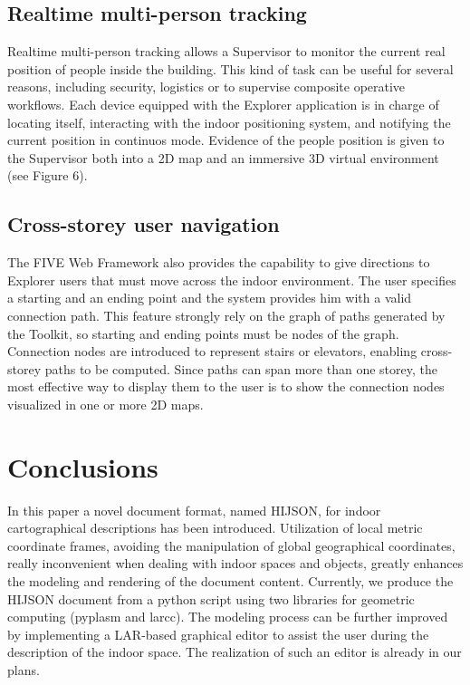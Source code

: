 \documentclass[]{egpubl}
\begin{document}
\subsection{Realtime multi-person tracking} Realtime multi-person tracking
allows a Supervisor to monitor the current real position of people inside the
building. This kind of task can be useful for several reasons, including
security, logistics or to supervise composite operative workflows. Each device
equipped with the Explorer application is in charge of locating itself,
interacting with the indoor positioning system, and notifying the current
position in continuos mode. Evidence of the people position is given to the
Supervisor both into a 2D map and an immersive 3D virtual environment (see
Figure 6).

\subsection{Cross-storey user navigation} The FIVE Web Framework also provides
the capability to give directions to Explorer users that must move across the
indoor environment. The user specifies a starting and an ending point and the
system provides him with a valid connection path. This feature strongly rely
on the graph of paths generated by the Toolkit, so starting and ending points
must be nodes of the graph. Connection nodes are introduced to represent
stairs or elevators, enabling cross-storey paths to be computed. Since paths
can span more than one storey, the most effective way to display them to the
user is to show the connection nodes visualized in one or more 2D maps.


\section{Conclusions}

In this paper a novel document format, named HIJSON, for indoor cartographical
descriptions has been introduced. Utilization of local metric coordinate
frames, avoiding the manipulation of global geographical coordinates, really
inconvenient when dealing with indoor spaces and objects, greatly enhances the
modeling and rendering of the document content. Currently, we produce the
HIJSON document from a python script using two libraries for geometric
computing (pyplasm and larcc). The modeling process can be further
improved by implementing a LAR-based graphical editor to assist the user
during the description of the indoor space. The realization of such an editor
is already in our plans. 
\end{document}
